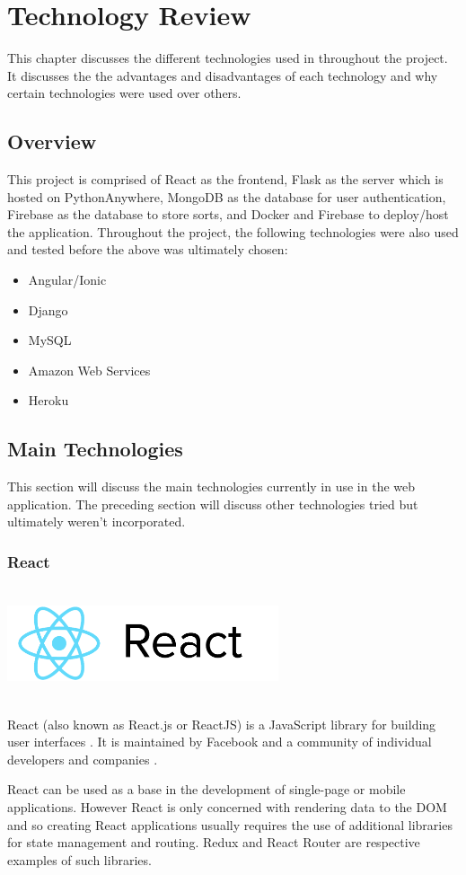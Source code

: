 \chapter{Technology Review}
This chapter discusses the different technologies used in throughout the
project. It discusses the the advantages and disadvantages of each technology 
and why certain technologies were used over others.

\section{Overview}
This project is comprised of React as the frontend, Flask as the server which is
hosted on PythonAnywhere, MongoDB as the database for user authentication, Firebase as the database to store sorts, and Docker and Firebase to deploy/host the application. Throughout the project, the following technologies were also used 
and tested before the above was ultimately chosen:
\begin{itemize}
    \item Angular/Ionic
    \item Django
    \item MySQL
    \item Amazon Web Services
    \item Heroku
\end{itemize}

\newpage
\section{Main Technologies}
This section will discuss the main technologies currently in use in the web 
application. The preceding section will discuss other technologies tried but 
ultimately weren't incorporated. 

\subsection{React}
\par
\medskip
\begin{center}
    \includegraphics[width=8cm,height=3.3cm,keepaspectratio]{images/react}
\end{center}
React (also known as React.js or ReactJS) is a JavaScript library for building 
user interfaces \cite{react_wiki}. It is maintained by Facebook and a community of individual 
developers and companies \cite{react_docs}.
\par
\bigskip
React can be used as a base in the development of single-page or mobile 
applications. However React is only concerned with rendering data to the DOM and
so creating React applications usually requires the use of additional libraries 
for state management and routing. Redux and React Router are respective examples
of such libraries. 

